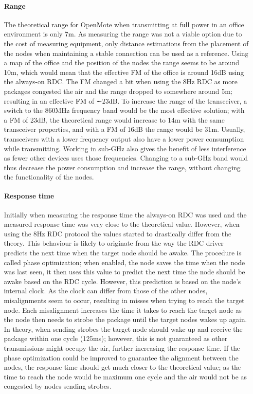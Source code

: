 \paragraph{Range}
The theoretical range for OpenMote when transmitting at full power in an office environment is only 7m.
As measuring the range was not a viable option due to the cost of measuring equipment,
	only distance estimations from the placement of the nodes when maintaining a stable connection can be used as a reference.
Using a map of the office and the position of the nodes the range seems to be around 10m,
	which would mean that the effective FM of the office is around 16dB using the always-on RDC.
The FM changed a bit when using the 8Hz RDC as more packages congested the air and the range dropped to somewhere around 5m;
	resulting in an effective FM of ∼23dB.
To increase the range of the transceiver,
	a switch to the 860MHz frequency band would be the most effective solution;
	with a FM of 23dB,
	the theoretical range would increase to 14m with the same transceiver properties,
	and with a FM of 16dB the range would be 31m.
Usually,
	transceivers with a lower frequency output also have a lower power consumption while transmitting.
Working in sub-GHz also gives the benefit of less interference as fewer other devices uses those frequencies.
Changing to a sub-GHz band would thus decrease the power consumption and increase the range,
	without changing the functionality of the nodes.

\paragraph{Response time}

Initially when measuring the response time the always-on RDC was used and the measured response time was very close to the theoretical value.
However,
	when using the 8Hz RDC protocol the values started to drastically differ from the theory.
This behaviour is likely to originate from the way the RDC driver predicts the next time when the target node should be awake.
The procedure is called phase optimization;
	when enabled,
	the node saves the time when the node was last seen,
	it then uses this value to predict the next time the node should be awake based on the RDC cycle.
However,
	this prediction is based on the node’s internal clock.
As the clock can differ from those of the other nodes,
	misalignments seem to occur,
	resulting in misses when trying to reach the target node.
Each misalignment increases the time it takes to reach the target node as the node then needs to strobe the package until the target nodes wakes up again.
In theory,
	when sending strobes the target node should wake up and receive the package within one cycle (125ms);
	however,
	this is not guaranteed as other transmissions might occupy the air,
	further increasing the response time.
If the phase optimization could be improved to guarantee the alignment between the nodes,
	the response time should get much closer to the theoretical value;
	as the time to reach the node would be maximum one cycle and the air would not be as congested by nodes sending strobes.

